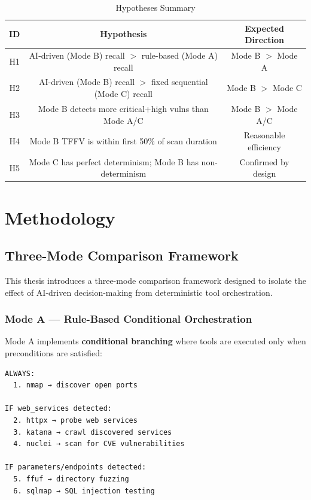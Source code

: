 \documentclass[12pt,a4paper,oneside]{book}
\begin{document}
\begin{table}[h]
\centering
\caption{Hypotheses Summary}
\label{tab:hypotheses}
\begin{tabular}{|c|c|c|}
\hline
\textbf{ID} & \textbf{Hypothesis} & \textbf{Expected Direction} \\ \hline
H1 & AI-driven (Mode B) recall $>$ rule-based (Mode A) recall & Mode B $>$ Mode A \\ \hline
H2 & AI-driven (Mode B) recall $>$ fixed sequential (Mode C) recall & Mode B $>$ Mode C \\ \hline
H3 & Mode B detects more critical+high vulns than Mode A/C & Mode B $>$ Mode A/C \\ \hline
H4 & Mode B TFFV is within first 50\% of scan duration & Reasonable efficiency \\ \hline
H5 & Mode C has perfect determinism; Mode B has non-determinism & Confirmed by design \\ \hline
\end{tabular}
\end{table}

\chapter{Methodology}

\section{Three-Mode Comparison Framework}

This thesis introduces a three-mode comparison framework designed to isolate the effect of AI-driven decision-making from deterministic tool orchestration.

\subsection{Mode A — Rule-Based Conditional Orchestration}

Mode A implements \textbf{conditional branching} where tools are executed only when preconditions are satisfied:

\begin{verbatim}
ALWAYS:
  1. nmap → discover open ports

IF web_services detected:
  2. httpx → probe web services
  3. katana → crawl discovered services
  4. nuclei → scan for CVE vulnerabilities

IF parameters/endpoints detected:
  5. ffuf → directory fuzzing
  6. sqlmap → SQL injection testing
\end{verbatim}
\end{document}
